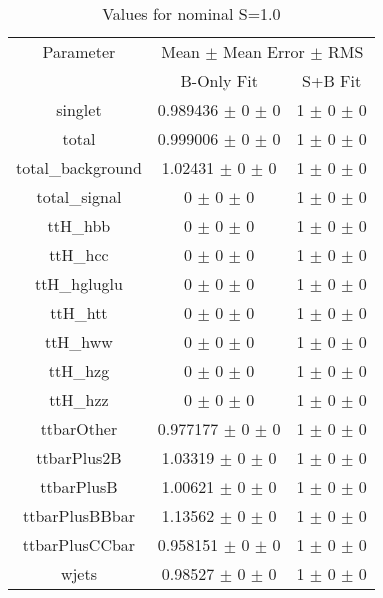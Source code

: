 \begin{table}
\centering
\caption{Values for nominal S=1.0}
\begin{tabular}{ccc}
\toprule
Parameter 	& \multicolumn{2}{c}{Mean $\pm$ Mean Error $\pm$ RMS}\\
 	& B-Only Fit & S+B Fit\\
\midrule
singlet 	& \num{0.989436} $\pm$ \num{0} $\pm$ \num{0} 	& \num{1} $\pm$ \num{0} $\pm$ \num{0}\\
total 	& \num{0.999006} $\pm$ \num{0} $\pm$ \num{0} 	& \num{1} $\pm$ \num{0} $\pm$ \num{0}\\
total\_background 	& \num{1.02431} $\pm$ \num{0} $\pm$ \num{0} 	& \num{1} $\pm$ \num{0} $\pm$ \num{0}\\
total\_signal 	& \num{0} $\pm$ \num{0} $\pm$ \num{0} 	& \num{1} $\pm$ \num{0} $\pm$ \num{0}\\
ttH\_hbb 	& \num{0} $\pm$ \num{0} $\pm$ \num{0} 	& \num{1} $\pm$ \num{0} $\pm$ \num{0}\\
ttH\_hcc 	& \num{0} $\pm$ \num{0} $\pm$ \num{0} 	& \num{1} $\pm$ \num{0} $\pm$ \num{0}\\
ttH\_hgluglu 	& \num{0} $\pm$ \num{0} $\pm$ \num{0} 	& \num{1} $\pm$ \num{0} $\pm$ \num{0}\\
ttH\_htt 	& \num{0} $\pm$ \num{0} $\pm$ \num{0} 	& \num{1} $\pm$ \num{0} $\pm$ \num{0}\\
ttH\_hww 	& \num{0} $\pm$ \num{0} $\pm$ \num{0} 	& \num{1} $\pm$ \num{0} $\pm$ \num{0}\\
ttH\_hzg 	& \num{0} $\pm$ \num{0} $\pm$ \num{0} 	& \num{1} $\pm$ \num{0} $\pm$ \num{0}\\
ttH\_hzz 	& \num{0} $\pm$ \num{0} $\pm$ \num{0} 	& \num{1} $\pm$ \num{0} $\pm$ \num{0}\\
ttbarOther 	& \num{0.977177} $\pm$ \num{0} $\pm$ \num{0} 	& \num{1} $\pm$ \num{0} $\pm$ \num{0}\\
ttbarPlus2B 	& \num{1.03319} $\pm$ \num{0} $\pm$ \num{0} 	& \num{1} $\pm$ \num{0} $\pm$ \num{0}\\
ttbarPlusB 	& \num{1.00621} $\pm$ \num{0} $\pm$ \num{0} 	& \num{1} $\pm$ \num{0} $\pm$ \num{0}\\
ttbarPlusBBbar 	& \num{1.13562} $\pm$ \num{0} $\pm$ \num{0} 	& \num{1} $\pm$ \num{0} $\pm$ \num{0}\\
ttbarPlusCCbar 	& \num{0.958151} $\pm$ \num{0} $\pm$ \num{0} 	& \num{1} $\pm$ \num{0} $\pm$ \num{0}\\
wjets 	& \num{0.98527} $\pm$ \num{0} $\pm$ \num{0} 	& \num{1} $\pm$ \num{0} $\pm$ \num{0}\\
\bottomrule
\end{tabular}
\end{table}